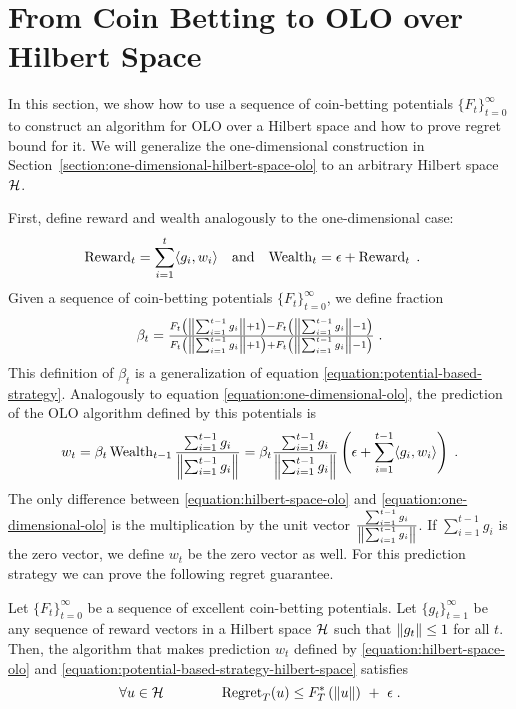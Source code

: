 \section{From Coin Betting to OLO over Hilbert Space}
\label{section:reduction_hilbert}

In this section, we show how to use a sequence of coin-betting potentials $\{F_t\}_{t=0}^\infty$
to construct an algorithm for \ac{OLO} over a Hilbert space
and how to prove regret bound for it.
We will generalize the one-dimensional construction in Section~\ref{section:one-dimensional-hilbert-space-olo} to an arbitrary
Hilbert space $\mathcal{H}$.

First, define reward and wealth analogously
to the one-dimensional case:
\begin{align*}
\operatorname{Reward}_t &= \sum_{i=1}^t \langle g_i, w_i \rangle &
& \text{and} &
\operatorname{Wealth}_t &= \epsilon + \operatorname{Reward}_t \; .
\end{align*}
Given a sequence of coin-betting potentials $\{F_t\}_{t=0}^\infty$,
we define fraction
\begin{equation}
\label{equation:potential-based-strategy-hilbert-space}
\beta_t = \tfrac{F_t \left(\left\|{\sum_{i=1}^{t-1} g_i}\right\| + 1\right) - F_t\left(\left\|{\sum_{i=1}^{t-1} g_i}\right\| - 1 \right)}{F_t\left(\left\|{\sum_{i=1}^{t-1} g_i}\right\| + 1 \right) + F_t\left(\left\|{\sum_{i=1}^{t-1} g_i}\right\| - 1 \right)} \; .
\end{equation}
This definition of $\beta_t$ is a generalization of equation
\eqref{equation:potential-based-strategy}.  Analogously to equation
\eqref{equation:one-dimensional-olo}, the prediction of the OLO algorithm
defined by this potentials is
\begin{equation}
\label{equation:hilbert-space-olo}
w_t = \beta_t \operatorname{Wealth}_{t-1} \frac{\sum_{i=1}^{t-1} g_i}{\left\|{\sum_{i=1}^{t-1} g_i}\right\|}
= \beta_t \frac{\sum_{i=1}^{t-1} g_i}{\left\|{\sum_{i=1}^{t-1} g_i}\right\|} \left(\epsilon+ \sum_{i=1}^{t-1} \langle g_i, w_i\rangle \right) \; .
\end{equation}
The only difference between \eqref{equation:hilbert-space-olo} and
\eqref{equation:one-dimensional-olo} is the multiplication by the unit vector
$\frac{\sum_{i=1}^{t-1} g_i}{\left\|{\sum_{i=1}^{t-1} g_i}\right\|}$. If $\sum_{i=1}^{t-1}
g_i$ is the zero vector, we define $w_t$ be the zero vector as well.
For this prediction strategy we can prove the following regret guarantee.
%
\begin{theorem}
\label{theorem:hilbert-space-olo-regret-bound}
Let $\{F_t\}_{t=0}^\infty$ be a sequence of excellent coin-betting potentials.
Let $\{g_t\}_{t=1}^\infty$ be any sequence of reward vectors in a Hilbert space
$\mathcal{H}$ such that $\left\|{g_t}\right\| \le 1$ for all $t$. Then, the algorithm that makes
prediction $w_t$ defined by \eqref{equation:hilbert-space-olo} and
\eqref{equation:potential-based-strategy-hilbert-space} satisfies
\[
\forall u \in \mathcal{H} \qquad \qquad
\operatorname{Regret}_T(u) \le F_T^*\left(\left\|{u}\right\| \right) \ + \ \epsilon \; .
\]
\end{theorem}

